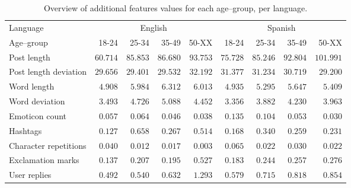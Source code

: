 \documentclass[10pt, a4paper]{article}
\begin{document}
\begin{table*}
\caption{Overview of additional features values for each age--group, per language.}
\label{tab:additionalfeatures-age}
\begin{center}
\begin{tabular}{l|rrrr|rrrr}
\toprule
Language & \multicolumn{4}{|c|}{English} & \multicolumn{4}{|c}{Spanish} \\
Age--group & 18-24 & 25-34 & 35-49 & 50-XX & 18-24 & 25-34 & 35-49 & 50-XX \\
\midrule
Post length & $ 60.714 $ & $ 85.853 $ & $ 86.680 $ & $ 93.753 $ & $ 75.728 $ & $ 85.246 $ & $ 92.804 $ & $ 101.991 $ \\
Post length deviation & $ 29.656 $ & $ 29.401 $ & $ 29.532 $ & $ 32.192 $ & $ 31.377 $ & $ 31.234 $ & $ 30.719 $ & $ 29.200 $ \\
Word length & $ 4.908 $ & $ 5.984 $ & $ 6.312 $ & $ 6.013 $ & $ 4.935 $ & $ 5.295 $ & $ 5.647 $ & $ 5.409 $ \\
Word deviation & $ 3.493 $ & $ 4.726 $ & $ 5.088 $ & $ 4.452 $ & $ 3.356 $ & $ 3.882 $ & $ 4.230 $ & $ 3.963 $ \\
Emoticon count & $ 0.057 $ & $ 0.064 $ & $ 0.046 $ & $ 0.038 $ & $ 0.135 $ & $ 0.104 $ & $ 0.053 $ & $ 0.030 $ \\
Hashtags & $ 0.127 $ & $ 0.658 $ & $ 0.267 $ & $ 0.514 $ & $ 0.168 $ & $ 0.340 $ & $ 0.259 $ & $ 0.231 $ \\
Character repetitions & $ 0.040 $ & $ 0.012 $ & $ 0.017 $ & $ 0.003 $ & $ 0.065 $ & $ 0.022 $ & $ 0.030 $ & $ 0.022 $ \\
Exclamation marks & $ 0.137 $ & $ 0.207 $ & $ 0.195 $ & $ 0.527 $ & $ 0.183 $ & $ 0.244 $ & $ 0.257 $ & $ 0.276 $ \\
User replies & $ 0.492 $ & $ 0.540 $ & $ 0.632 $ & $ 1.293 $ & $ 0.579 $ & $ 0.715 $ & $ 0.818 $ & $ 0.854 $ \\
\bottomrule
\end{tabular}
\end{center}
\end{table*}
\end{document}
